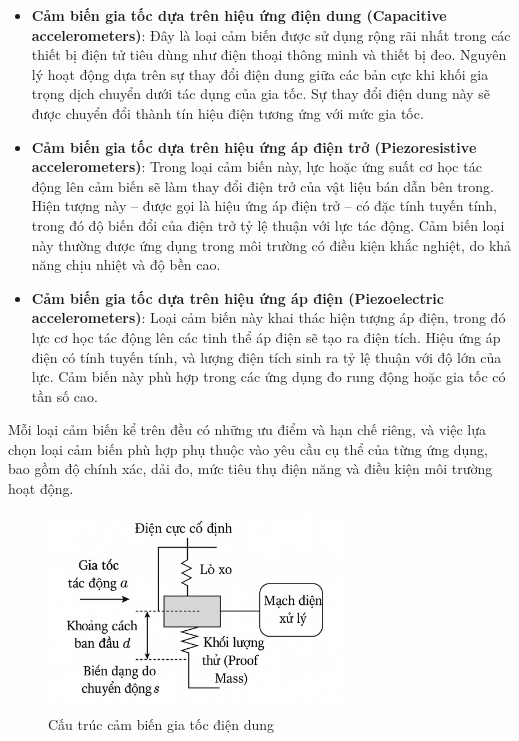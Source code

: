 \begin{itemize}
    \item \textbf{Cảm biến gia tốc dựa trên hiệu ứng điện dung (Capacitive accelerometers)}: Đây là loại cảm biến được sử dụng rộng rãi nhất trong các thiết bị điện tử tiêu dùng như điện thoại thông minh và thiết bị đeo. Nguyên lý hoạt động dựa trên sự thay đổi điện dung giữa các bản cực khi khối gia trọng dịch chuyển dưới tác dụng của gia tốc. Sự thay đổi điện dung này sẽ được chuyển đổi thành tín hiệu điện tương ứng với mức gia tốc.

    \item \textbf{Cảm biến gia tốc dựa trên hiệu ứng áp điện trở (Piezoresistive accelerometers)}: Trong loại cảm biến này, lực hoặc ứng suất cơ học tác động lên cảm biến sẽ làm thay đổi điện trở của vật liệu bán dẫn bên trong. Hiện tượng này – được gọi là hiệu ứng áp điện trở – có đặc tính tuyến tính, trong đó độ biến đổi của điện trở tỷ lệ thuận với lực tác động. Cảm biến loại này thường được ứng dụng trong môi trường có điều kiện khắc nghiệt, do khả năng chịu nhiệt và độ bền cao.

    \item \textbf{Cảm biến gia tốc dựa trên hiệu ứng áp điện (Piezoelectric accelerometers)}: Loại cảm biến này khai thác hiện tượng áp điện, trong đó lực cơ học tác động lên các tinh thể áp điện sẽ tạo ra điện tích. Hiệu ứng áp điện có tính tuyến tính, và lượng điện tích sinh ra tỷ lệ thuận với độ lớn của lực. Cảm biến này phù hợp trong các ứng dụng đo rung động hoặc gia tốc có tần số cao.
\end{itemize}

Mỗi loại cảm biến kể trên đều có những ưu điểm và hạn chế riêng, và việc lựa chọn loại cảm biến phù hợp phụ thuộc vào yêu cầu cụ thể của từng ứng dụng, bao gồm độ chính xác, dải đo, mức tiêu thụ điện năng và điều kiện môi trường hoạt động.



\begin{figure}[H]
	\centering
	\includegraphics[width=0.7\textwidth]{images/diendung.png}
	\vspace*{-7mm}
	\caption{Cấu trúc cảm biến gia tốc điện dung}
	\label{acce_mems}
\end{figure}




